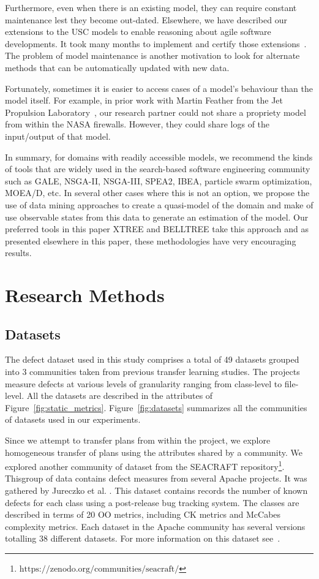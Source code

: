 \documentclass[10pt,journal,compsoc]{IEEEtran}
\newcommand{\fig}[1]{Figure~\ref{fig:#1}}
\begin{document}
Furthermore, even when there is an existing model, they can require constant  maintenance lest they become out-dated. Elsewhere, we have described our extensions to the USC models to enable reasoning about agile software developments. It took many months to implement and certify those extensions~\cite{me09i,me09j}. The problem of model maintenance is another motivation to look for alternate methods that can be automatically updated with new data.

Fortunately, sometimes  it is easier to access cases of a model's behaviour than the model itself. For example, in prior work with Martin  Feather from the Jet Propulsion Laboratory~\cite{fea02a},  our research partner could not share a propriety model from within the NASA firewalls. However, they could share logs of the input/output of that model.

In summary, for domains with readily accessible models, we recommend
the kinds of tools that are widely used in the search-based
software engineering community such as GALE, NSGA-II, NSGA-III, SPEA2, IBEA, particle swarm optimization, MOEA/D, etc. In several other cases where this is not an option, we propose the use of data mining approaches to create a quasi-model of the domain 
and make of use observable states from this data to generate an estimation of the model. Our preferred tools in this paper XTREE and BELLTREE take this approach and as presented elsewhere in this paper, these methodologies have very encouraging results.


\section{Research Methods}
\label{sect:prelim}
\subsection{Datasets}
\label{sect:data}
The defect dataset used in this study comprises a total of 49 datasets grouped into 3 communities taken
from previous transfer learning studies. The projects measure defects at various levels of granularity ranging from class-level to file-level. All the datasets are described in the attributes of \fig{static_metrics}.
\fig{datasets} summarizes all the communities of datasets used in our experiments. 

Since we attempt to transfer plans from within the project, we explore homogeneous
transfer of plans using the attributes shared by a community. We explored another community of dataset from the SEACRAFT repository\footnote{$\text{https://zenodo.org/communities/seacraft/}$}. Thisgroup of data contains defect measures from several Apache projects. 
It was gathered by Jureczko et al. \cite{Jureczko2010}. This dataset 
contains records the number of known defects for each class using a 
post-release bug tracking system. The classes are described in terms of 20 
OO metrics, including CK metrics and McCabes complexity metrics. Each 
dataset in the Apache community has several versions totalling 38 
different datasets. For more information on this dataset
see~\cite{krishna16}. 
\end{document}
